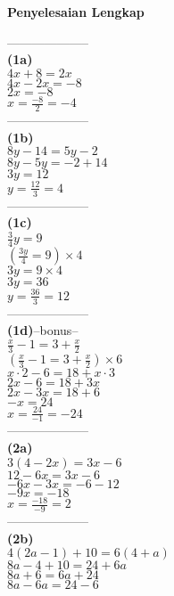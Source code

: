 \documentclass[11pt,a4paper]{article}
\begin{document}
\begin{flushleft}
\newpage
{\bf Penyelesaian Lengkap}\\[0.3em]
\begin{minipage}{5.5cm}
{\color{blue} --------------------}\\
{\bf (1a)}\\
$4x+8=2x$\\
$4x-2x=-8$\\
$2x=-8$\\
$x=\frac{-8}{2}=-4$\\
{\color{blue} --------------------}\\
{\bf (1b)}\\
$8y-14=5y-2$\\
$8y-5y=-2+14$\\
$3y=12$\\
$y=\frac{12}{3}=4$\\
{\color{blue} --------------------}\\
{\bf (1c)}\\
$\frac{3}{4}y=9$\\
$(\frac{3y}{4}=9)\times 4$\\
$3y=9\times 4$\\
$3y=36$\\
$y=\frac{36}{3}=12$\\
{\color{blue} --------------------}\\
{\bf (1d)}--bonus--\\
$\frac{x}{3}-1=3+\frac{x}{2}$\\
$(\frac{x}{3}-1=3+\frac{x}{2})\times 6$\\
$x\cdot2 - 6=18 + x\cdot3$\\
$2x-6=18+3x$\\
$2x-3x=18+6$\\
$-x=24$\\
$x=\frac{24}{-1}=-24$\\
{\color{blue} --------------------}\\
{\bf (2a)}\\
$3(4-2x)=3x-6$\\
$12-6x=3x-6$\\
$-6x-3x=-6-12$\\
$-9x=-18$\\
$x=\frac{-18}{-9}=2$\\
{\color{blue} --------------------}\\
{\bf (2b)}\\
$4(2a-1)+10=6(4+a)$\\
$8a-4+10=24+6a$\\
$8a+6=6a+24$\\
$8a-6a=24-6$\\

\end{minipage}
\end{flushleft}
\end{document}
